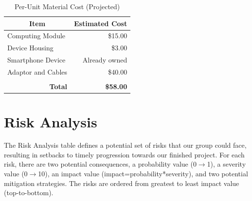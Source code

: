 \begin{table}[]
\centering
\caption{Per-Unit Material Cost (Projected)}
\label{manufactureCost}
\begin{tabular}{|l|r|}
\hline
\multicolumn{1}{|c|}{\textbf{Item}}  & \multicolumn{1}{c|}{\textbf{Estimated Cost}} \\ \hline
Computing Module                     & \$15.00                                      \\ \hline
Device Housing                       & \$3.00                                       \\ \hline
Smartphone Device                    & Already owned                                \\ \hline
Adaptor and Cables                   & \$40.00                                      \\ \hline
                                     & \multicolumn{1}{l|}{}                        \\ \hline
\multicolumn{1}{|r|}{\textbf{Total}} & \textbf{\$58.00}                             \\ \hline
\end{tabular}
\end{table}


\chapter{Risk Analysis}
	The Risk Analysis table defines a potential set of risks that our group could face, resulting in setbacks to timely progression towards our finished project. For each risk, there are two potential consequences, a probability value (0$\rightarrow$1), a severity value (0$\rightarrow$10), an impact value (impact=probability*severity), and two potential mitigation strategies. The risks are ordered from greatest to least impact value (top-to-bottom).

